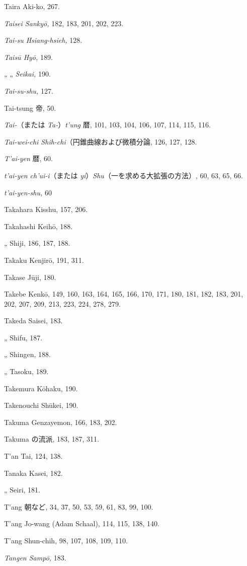 \documentclass[11pt]{article}
\begin{document}
Taira Aki-ko, 267.\par
\emph{Taisei Sankyō,} 182, 183, 201, 202, 223.\par
\emph{Tai-su Hsiang-hsieh,} 128.\par
\emph{Taisū Hyō,} 189.\par
\quad „ „ \emph{Seikai,} 190.\par
\emph{Tai-su-shu,} 127.\par
Tai-tsung 帝, 50.\par
\emph{Tai-}（または \emph{Ta-}）\emph{t'ung} 暦, 101, 103, 104, 106, 107, 114, 115, 116.\par
\emph{Tai-wei-chi Shih-chi}（円錐曲線および微積分論, 126, 127, 128.\par
\emph{T'ai-yen} 暦, 60.\par
\emph{t'ai-yen ch'ui-i}（または \emph{yi}）\emph{Shu}（一を求める大拡張の方法）, 60, 63, 65, 66.\par
\emph{t'ai-yen-shu,} 60\par
Takahara Kisshu, 157, 206.\par
Takahashi Keihō, 188.\par
\quad „ Shiji, 186, 187, 188.\par
Takaku Kenjirō, 191, 311.\par
Takase Jūji, 180.\par
Takebe Kenkō, 149, 160, 163, 164, 165, 166, 170, 171, 180, 181, 182, 183, 201, 202, 207, 209, 213, 223, 224, 278, 279.\par
Takeda Saisei, 183.\par
\quad „ Shifu, 187.\par
\quad „ Shingen, 188.\par
\quad „ Tasoku, 189.\par
Takemura Kōhaku, 190.\par
Takenouchi Shūkei, 190.\par
Takuma Genzayemon, 166, 183, 202.\par
Takuma の流派, 183, 187, 311.\par
T'an Tai, 124, 138.\par
Tanaka Kasei, 182.\par
\quad „ Seiri, 181.\par
T'ang 朝など, 34, 37, 50, 53, 59, 61, 83, 99, 100.\par
T'ang Jo-wang (Adam Schaal), 114, 115, 138, 140.\par
T'ang Shun-chih, 98, 107, 108, 109, 110.\par
\emph{Tangen Sampō,} 183.\par
\end{document}
